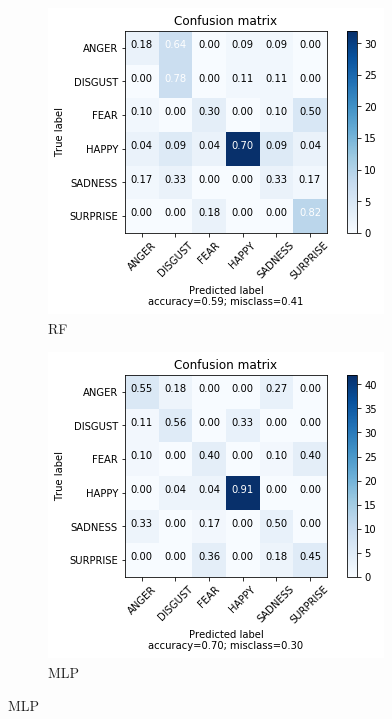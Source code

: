 \begin{figure}
\begin{subfigure}[b]{0.22\textwidth}
        \includegraphics[width=\textwidth]{figures/pca-rf.png}
        \caption{RF}
        \label{fig:pca-rf}
    \end{subfigure}
    \begin{subfigure}[b]{0.22\textwidth}
        \includegraphics[width=\textwidth]{figures/pca-mlp.png}
        \caption{MLP}
        \label{fig:pca-mlp}
    \end{subfigure}

\end{figure}
